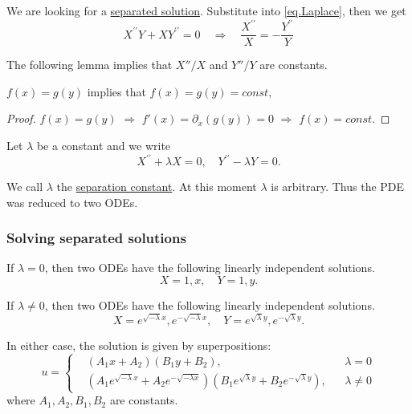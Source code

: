 We are looking for a \underline{separated solution}. Substitute into \eqref{eq.Laplace}, then we get 
\begin{equation*}
    X^{\prime \prime} Y+X Y^{\prime \prime}=0 \quad\Rightarrow\quad
    \frac{X^{\prime \prime}}{X}= -\frac{Y^{\prime \prime}}{Y}
\end{equation*}

The following lemma implies that $X''/X$ and $Y''/Y$ are constants.

\begin{lemma}[]
    $f(x) = g(y)$ implies that $f(x) = g(y) = \textit{const}$,
\end{lemma}
\begin{proof}
    $f(x) = g(y)$ $\Rightarrow$ $f'(x) = \partial_x (g(y)) = 0$ $\Rightarrow$ $f(x) = \textit{const}$.
\end{proof}

Let $\lambda$ be a constant and we write
\begin{equation*}
    X^{\prime \prime}+\lambda X=0, \quad Y^{\prime \prime}-\lambda Y=0 .
\end{equation*}

We call $\lambda$ the \underline{separation constant}. At this moment $\lambda$ is arbitrary. Thus the PDE was reduced to two ODEs.

\subsubsection{Solving separated solutions}

If $\lambda=0$, then two ODEs have the following linearly independent solutions.
\begin{equation}\label{eq.separated_basis_0}
X=1, x, \quad Y=1, y.
\end{equation}

If $\lambda \neq 0$, then two ODEs have the following linearly independent solutions.
\begin{equation}\label{eq.separated_basis}
X=e^{\sqrt{-\lambda} x}, e^{-\sqrt{-\lambda} x}, \quad Y=e^{\sqrt{\lambda} y}, e^{-\sqrt{\lambda} y} .
\end{equation}

In either case, the solution is given by superpositions:
\begin{equation}\label{eq.basis_separated}
u=
\left\{\begin{aligned}
&\left(A_1 x+A_2\right)\left(B_1 y+B_2\right), && \lambda=0 
\\
&\left(A_1 e^{\sqrt{-\lambda} x}+A_2 e^{-\sqrt{-\lambda x}}\right)\left(B_1 e^{\sqrt{\lambda} y}+B_2 e^{-\sqrt{\lambda} y}\right), && \lambda \neq 0
\end{aligned}\right.
\end{equation}
where $A_1, A_2, B_1, B_2$ are constants. 

